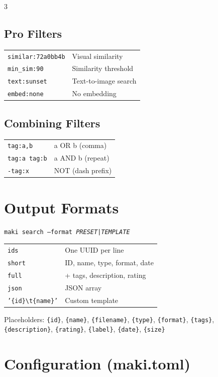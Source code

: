 \documentclass[a4paper,landscape,8pt]{article}
\newcommand{\cmd}[1]{\texttt{\footnotesize #1}}
\begin{document}
\begin{multicols}{3}
\subsection{Pro Filters}
\begin{tabularx}{\columnwidth}{@{}lX@{}}
\cmd{similar:72a0bb4b} & Visual similarity \\
\cmd{min\_sim:90} & Similarity threshold \\
\cmd{text:sunset} & Text-to-image search \\
\cmd{embed:none} & No embedding \\
\end{tabularx}

\subsection{Combining Filters}
\begin{tabularx}{\columnwidth}{@{}lX@{}}
\cmd{tag:a,b} & a OR b (comma) \\
\cmd{tag:a tag:b} & a AND b (repeat) \\
\cmd{-tag:x} & NOT (dash prefix) \\
\end{tabularx}

\section{Output Formats}

\cmd{maki search --format \textit{PRESET|TEMPLATE}}

\begin{tabularx}{\columnwidth}{@{}lX@{}}
\cmd{ids} & One UUID per line \\
\cmd{short} & ID, name, type, format, date \\
\cmd{full} & + tags, description, rating \\
\cmd{json} & JSON array \\
\cmd{'\{id\}\textbackslash t\{name\}'} & Custom template \\
\end{tabularx}

Placeholders: \cmd{\{id\}}, \cmd{\{name\}}, \cmd{\{filename\}}, \cmd{\{type\}}, \cmd{\{format\}}, \cmd{\{tags\}}, \cmd{\{description\}}, \cmd{\{rating\}}, \cmd{\{label\}}, \cmd{\{date\}}, \cmd{\{size\}}

\section{Configuration (maki.toml)}


\end{multicols}
\end{document}

